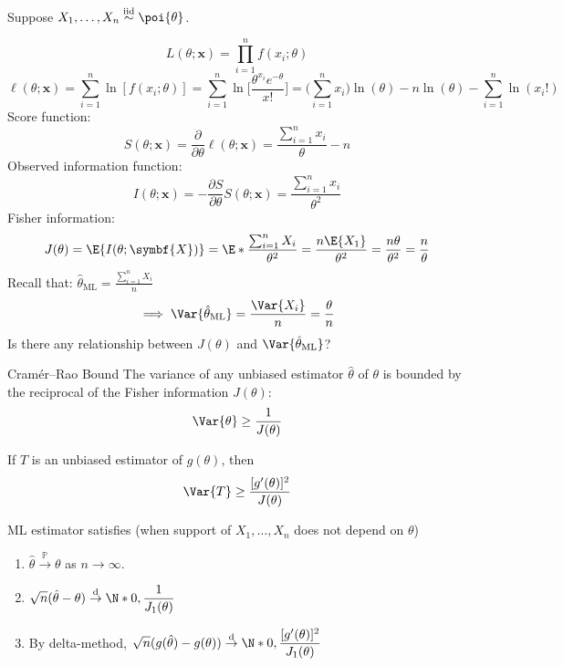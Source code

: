 \begin{Example}{}{}
    Suppose $ X_1,\ldots,X_n\stackrel{\text{iid}}{\sim}\poi{\theta} $.

    \[ L(\theta;\symbf{x})=\prod_{i=1}^n f(x_i;\theta) \]
    \[ \ell(\theta;\symbf{x})=\sum_{i=1}^{n}
        \ln[f(x_i;\theta)]=\sum_{i=1}^{n}
        \ln\biggl[\frac{\theta^{x_i}e^{-\theta}}{x!} \biggr]=
        \biggl(\sum_{i=1}^{n} x_i\biggr)\ln(\theta)-
        n\ln(\theta)-\sum_{i=1}^{n} \ln(x_i!) \]
    Score function:
    \[ S(\theta;\symbf{x})=\frac{\partial}{\partial\theta}\ell(\theta;\symbf{x})
        =\frac{\sum_{i=1}^{n} x_i}{\theta}-n   \]
    Observed information function:
    \[ I(\theta;\symbf{x})=
        -\frac{\partial S}{\partial \theta}S(\theta;\symbf{x})
        =\frac{\sum_{i=1}^{n} x_i}{\theta^2}   \]
    Fisher information:
    \[ J(\theta)=\E{I(\theta;\symbf{X})}=
        \E*{\frac{\sum_{i=1}^{n} X_i}{\theta^2}}=
        \frac{n\E{X_1}}{\theta^2}=\frac{n\theta}{\theta^2}=\frac{n}{\theta}  \]
    Recall that: $ \displaystyle \hat{\theta}_{\text{ML}}=\frac{\sum_{i=1}^{n} X_i}{n} $
    \[ \implies \Var{\hat{\theta}_{\text{ML}}}=
        \frac{\Var{X_i}}{n}=\frac{\theta}{n}  \]
    Is there any relationship between $ J(\theta) $
    and $ \Var{\hat{\theta}_{\text{ML}}} $?
\end{Example}
\begin{Theorem}{Cramér–Rao Bound}{}
    The variance of any unbiased estimator
    $ \hat{\theta} $ of $ \theta $ is bounded by the reciprocal
    of the Fisher information $ J(\theta) $:
    \[ \Var{\theta}\ge \frac{1}{J(\theta)}  \]
\end{Theorem}
\begin{Corollary}{}{}
    If $ T $ is an unbiased estimator of $ g(\theta) $, then
    \[ \Var{T}\ge \frac{[g^\prime(\theta)]^2}{J(\theta)} \]
\end{Corollary}
\begin{Theorem}{}{}
    ML estimator satisfies (when support of $ X_1,\ldots,X_n $
    does not depend on $ \theta $)
    \begin{enumerate}[label=(\arabic*)]
        \item $ \hat{\theta}\stackrel{\mathbb{P}}{\to}\theta $
              as $ n\to\infty $.
        \item $ \displaystyle \sqrt{n}(\hat{\theta}-\theta)\stackrel{\text{d}}{\to}
                  \N*{0,\frac{1}{J_1(\theta)}} $
        \item By delta-method,
              $ \displaystyle \sqrt{n}(g(\hat{\theta})-g(\theta))\stackrel{\text{d}}{\to}
                  \N*{0,\frac{[g^\prime(\theta)]^2}{J_1(\theta)} } $
    \end{enumerate}
\end{Theorem}
